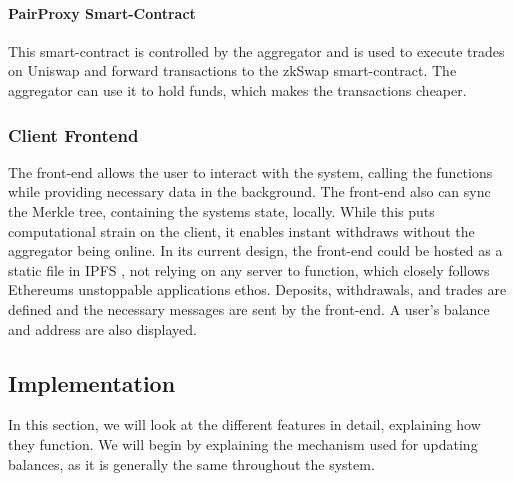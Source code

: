 \documentclass[../../thesis.tex]{subfiles}
\begin{document}
\paragraph{PairProxy Smart-Contract}
This smart-contract is controlled by the aggregator and is used to execute trades on Uniswap and forward transactions to the zkSwap smart-contract. The aggregator can use it to hold funds, which makes the transactions cheaper. 

\subsubsection{Client Frontend}
The front-end allows the user to interact with the system, calling the functions while providing necessary data in the background. The front-end also can sync the Merkle tree, containing the systems state, locally. While this puts computational strain on the client, it enables instant withdraws without the aggregator being online. In its current design, the front-end could be hosted as a static file in IPFS \cite{benet2014ipfs}, not relying on any server to function, which closely follows Ethereums unstoppable applications ethos. Deposits, withdrawals, and trades are defined and the necessary messages are sent by the front-end. A user's balance and address are also displayed. 

\subsection{Implementation}
In this section, we will look at the different features in detail, explaining how they function. We will begin by explaining the mechanism used for updating balances, as it is generally the same throughout the system. 

\end{document}
